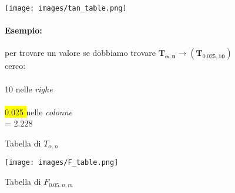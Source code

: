 \documentclass[]{article}
\begin{document}
    \begin{figure}[H]
        \caption{Tabella di $T_{\alpha, n}$}
        \begin{minipage}{0.59\textwidth}
            \texttt{[image: images/tan\_table.png]}
        \end{minipage}
        \begin{minipage}{0.4\textwidth}
            \paragraph{Esempio:} per trovare un valore
            se dobbiamo trovare $\boldsymbol{T_{\alpha,n} \rightarrow (T_{0.025,10})}$ \\
            cerco: \\ \\
            \colorbox{bittersweet}{10} nelle \textit{righe} \\ \\
            \colorbox{yellow}{0.025
            } nelle \textit{colonne} \\
            = 2.228
        \end{minipage}
    \end{figure}
    \begin{figure}[H]
        \caption{Tabella di $F_{0.05, n, m}$}
        \begin{minipage}{0.59\textwidth}
            \texttt{[image: images/F\_table.png]}
        \end{minipage}
        \begin{minipage}{0.4\textwidth}
        \end{minipage}
    \end{figure}
\end{document}
